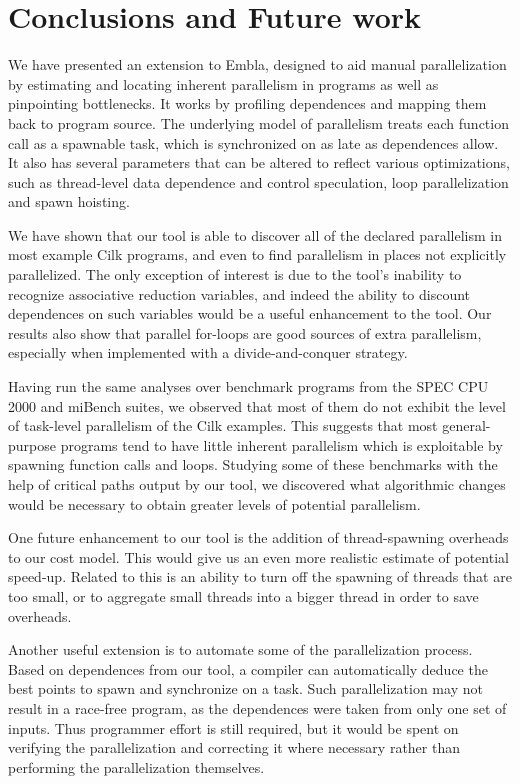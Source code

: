 \section{Conclusions and Future work}

We have presented an extension to Embla, designed to aid manual parallelization by estimating and locating inherent parallelism in programs as well as pinpointing bottlenecks.
It works by profiling dependences and mapping them back to program source.
The underlying model of parallelism treats each function call as a spawnable task, which is synchronized on as late as dependences allow.
It also has several parameters that can be altered to reflect various optimizations, such as thread-level data dependence and control speculation, loop parallelization and spawn hoisting.

We have shown that our tool is able to discover all of the declared parallelism in most example Cilk programs, and even to find parallelism in places not explicitly parallelized.
The only exception of interest is due to the tool's inability to recognize associative reduction variables, and indeed the ability to discount dependences on such variables would be a useful enhancement to the tool.
Our results also show that parallel for-loops are good sources of extra parallelism, especially when implemented with a divide-and-conquer strategy.

Having run the same analyses over benchmark programs from the SPEC CPU 2000 and miBench suites, we observed that most of them do not exhibit the level of task-level parallelism of the Cilk examples.
This suggests that most general-purpose programs tend to have little inherent parallelism which is exploitable by spawning function calls and loops.
Studying some of these benchmarks with the help of critical paths output by our tool, we discovered what algorithmic changes would be necessary to obtain greater levels of potential parallelism.

One future enhancement to our tool is the addition of thread-spawning overheads to our cost model.
This would give us an even more realistic estimate of potential speed-up.
Related to this is an ability to turn off the spawning of threads that are too small, or to aggregate small threads into a bigger thread in order to save overheads.

Another useful extension is to automate some of the parallelization process.
Based on dependences from our tool, a compiler can automatically deduce the best points to spawn and synchronize on a task.
Such parallelization may not result in a race-free program, as the dependences were taken from only one set of inputs.
Thus programmer effort is still required, but it would be spent on verifying the parallelization and correcting it where necessary rather than performing the parallelization themselves.

